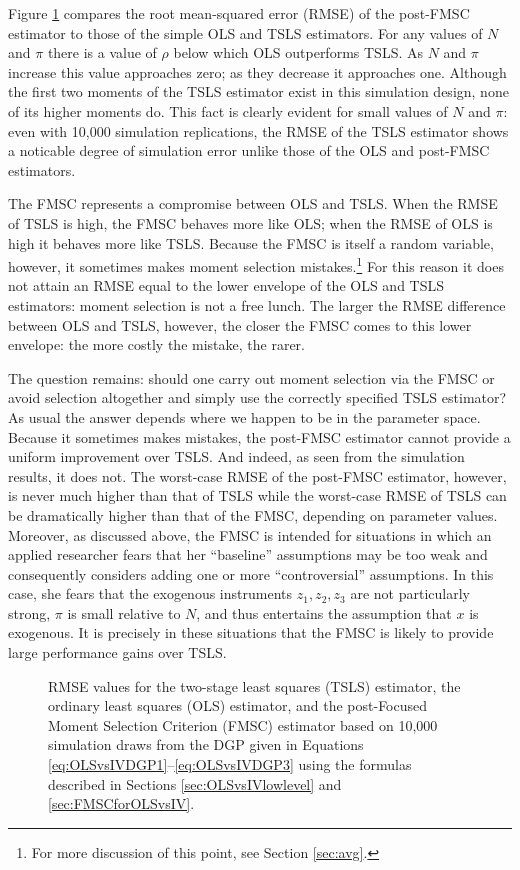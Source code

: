 Figure \ref{fig:OLSvsIV_RMSEbaseline} compares the root mean-squared error (RMSE) of the post-FMSC estimator to those of the simple OLS and TSLS estimators.
For any values of $N$ and $\pi$ there is a value of $\rho$ below which OLS outperforms TSLS. 
As $N$ and $\pi$ increase this value approaches zero; as they decrease it approaches one.
Although the first two moments of the TSLS estimator exist in this simulation design, none of its higher moments do. 
This fact is clearly evident for small values of $N$ and $\pi$: even with 10,000 simulation replications, the RMSE of the TSLS estimator shows a noticable degree of simulation error unlike those of the OLS and post-FMSC estimators.

The FMSC represents a compromise between OLS and TSLS.
When the RMSE of TSLS is high, the FMSC behaves more like OLS; when the RMSE of OLS is high it behaves more like TSLS.
Because the FMSC is itself a random variable, however, it sometimes makes moment selection mistakes.\footnote{For more discussion of this point, see Section \ref{sec:avg}.} 
For this reason it does not attain an RMSE equal to the lower envelope of the OLS and TSLS estimators: moment selection is not a free lunch.
The larger the RMSE difference between OLS and TSLS, however, the closer the FMSC comes to this lower envelope: the more costly the mistake, the rarer.

The question remains: should one carry out moment selection via the FMSC or avoid selection altogether and simply use the correctly specified TSLS estimator?
As usual the answer depends where we happen to be in the parameter space.
Because it sometimes makes mistakes, the post-FMSC estimator cannot provide a uniform improvement over TSLS.
And indeed, as seen from the simulation results, it does not.
The worst-case RMSE of the post-FMSC estimator, however, is never much higher than that of TSLS while the worst-case RMSE of TSLS can be dramatically higher than that of the FMSC, depending on parameter values.
Moreover, as discussed above, the FMSC is intended for situations in which an applied researcher fears that her ``baseline'' assumptions may be too weak and consequently considers adding one or more ``controversial'' assumptions. 
In this case, she fears that the exogenous instruments $z_1, z_2, z_3$ are not particularly strong, $\pi$ is small relative to $N$, and thus entertains the assumption that $x$ is exogenous.
It is precisely in these situations that the FMSC is likely to provide large performance gains over TSLS.

\begin{figure}
\centering
	
	\caption{RMSE values for the two-stage least squares (TSLS) estimator, the ordinary least squares (OLS) estimator, and the post-Focused Moment Selection Criterion (FMSC) estimator based on 10,000 simulation draws from the DGP given in Equations \ref{eq:OLSvsIVDGP1}--\ref{eq:OLSvsIVDGP3} using the formulas described in Sections \ref{sec:OLSvsIVlowlevel} and \ref{sec:FMSCforOLSvsIV}.}
	\label{fig:OLSvsIV_RMSEbaseline}
\end{figure}

